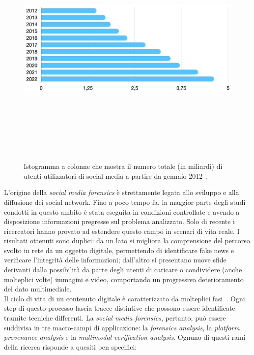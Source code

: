\begin{figure}[h!]
    \centering
    \includegraphics[width=15cm,height=12cm,keepaspectratio]{Immagini/statistiche_social.png}
    \caption{Istogramma a colonne che mostra il numero totale (in miliardi) di utenti utilizzatori di social media a partire da gennaio 2012~\cite{kemp}.}
    \label{fig:social_networks}
\end{figure}

\noindent
L'origine della \textit{social media forensics} è strettamente legata allo sviluppo e alla diffusione dei social network. Fino a poco tempo fa, la maggior parte degli studi condotti in questo ambito è stata eseguita in condizioni controllate e avendo a disposizione informazioni pregresse sul problema analizzato. Solo di recente i ricercatori hanno provato ad estendere questo campo in scenari di vita reale. I risultati ottenuti sono duplici: da un lato si migliora la comprensione del percorso svolto in rete da un oggetto digitale, permettendo di identificare fake news e verificare l'integrità delle informazioni; dall'altro si presentano nuove sfide derivanti dalla possibilità da parte degli utenti di caricare o condividere (anche molteplici volte) immagini e video, comportando un progressivo deterioramento del dato multimediale.\\
Il ciclo di vita di un contenuto digitale è caratterizzato da molteplici fasi~\cite{pasquini2021media}. Ogni step di questo processo lascia tracce distintive che possono essere identificate tramite tecniche differenti. La \textit{social media forensics}, pertanto, può essere suddivisa in tre macro-campi di applicazione: la \textit{forensics analysis}, la \textit{platform provenance analysis} e la \textit{multimodal verification analysis}. Ognuno di questi rami della ricerca risponde a quesiti ben specifici:

